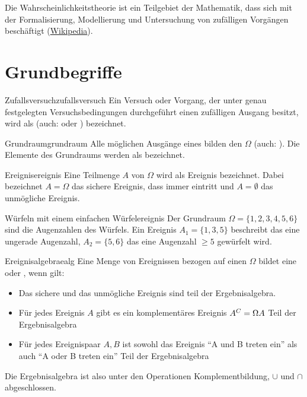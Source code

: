 Die Wahrscheinlichkeitstheorie ist ein Teilgebiet der Mathematik, dass sich mit
der Formalisierung, Modellierung und Untersuchung von zufälligen Vorgängen
beschäftigt (\href{https://de.wikipedia.org/wiki/Wahrscheinlichkeitstheorie}
{Wikipedia}).

\section{Grundbegriffe}

\begin{definition}{Zufallsversuch}{zufallsversuch}
Ein Versuch oder Vorgang, der unter genau festgelegten Versuchsbedingungen
durchgeführt einen zufälligen Ausgang besitzt, wird als 
(auch:  oder )
bezeichnet.
\end{definition}


\begin{definition}{Grundraum}{grundraum}
Alle möglichen Ausgänge eines 
bilden den  $\Omega$ (auch: ). Die
Elemente des Grundraums werden als  bezeichnet.
\end{definition}


\begin{definition}{Ereignis}{ereignis}
Eine Teilmenge $A$ von $\Omega$ wird als Ereignis bezeichnet. Dabei bezeichnet
$A = \Omega$ das sichere Ereignis, dass immer eintritt und $A = \emptyset$ das
unmögliche Ereignis.
\end{definition}

\begin{example}{Würfeln mit einem einfachen Würfel}{ereignis}
Der Grundraum $\Omega = \{1,2,3,4,5,6\}$
sind die Augenzahlen des Würfels. Ein Ereignis $A_1 = \{1,3,5\}$ beschreibt das
eine ungerade Augenzahl, $A_2 = \{5,6\}$ das
eine Augenzahl $\ge 5$ gewürfelt wird.
\end{example}


\begin{definition}{Ereignisalgebra}{ealg}
Eine Menge von Ereignissen bezogen auf einen 
$\Omega$ bildet eine  oder , wenn gilt:

  \begin{itemize}
    \item Das sichere und das unmögliche Ereignis sind teil der Ergebnisalgebra.
    \item{Für jedes Ereignis $A$ gibt es ein komplementäres Ereignis $A^C =
\Omega \\ A$ Teil der Ergebnisalgebra}
    \item{Für jedes Ereignispaar $A,B$ ist sowohl das Ereignis "`A und B treten
ein"' als auch "`A oder B treten ein"' Teil der Ergebnisalgebra}
  \end{itemize}

Die Ergebnisalgebra ist also unter den Operationen Komplementbildung, $\cup$ und
$\cap$ abgeschlossen.
\end{definition}

